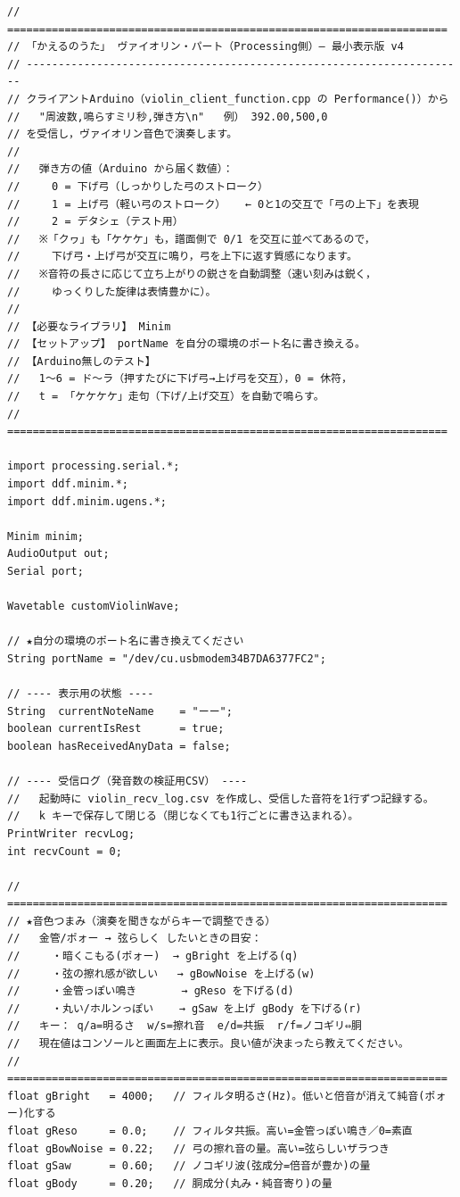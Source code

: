 \begin{lstlisting}
// =====================================================================
// 「かえるのうた」 ヴァイオリン・パート（Processing側）― 最小表示版 v4
// ---------------------------------------------------------------------
// クライアントArduino（violin_client_function.cpp の Performance()）から
//   "周波数,鳴らすミリ秒,弾き方\n"   例） 392.00,500,0
// を受信し，ヴァイオリン音色で演奏します。
//
//   弾き方の値（Arduino から届く数値）：
//     0 = 下げ弓（しっかりした弓のストローク）
//     1 = 上げ弓（軽い弓のストローク）   ← 0と1の交互で「弓の上下」を表現
//     2 = デタシェ（テスト用）
//   ※「クヮ」も「ケケケ」も，譜面側で 0/1 を交互に並べてあるので，
//     下げ弓・上げ弓が交互に鳴り，弓を上下に返す質感になります。
//   ※音符の長さに応じて立ち上がりの鋭さを自動調整（速い刻みは鋭く，
//     ゆっくりした旋律は表情豊かに）。
//
// 【必要なライブラリ】 Minim
// 【セットアップ】 portName を自分の環境のポート名に書き換える。
// 【Arduino無しのテスト】
//   1〜6 = ド〜ラ（押すたびに下げ弓→上げ弓を交互），0 = 休符，
//   t = 「ケケケケ」走句（下げ/上げ交互）を自動で鳴らす。
// =====================================================================

import processing.serial.*;
import ddf.minim.*;
import ddf.minim.ugens.*;

Minim minim;
AudioOutput out;
Serial port;

Wavetable customViolinWave;

// ★自分の環境のポート名に書き換えてください
String portName = "/dev/cu.usbmodem34B7DA6377FC2";

// ---- 表示用の状態 ----
String  currentNoteName    = "ーー";
boolean currentIsRest      = true;
boolean hasReceivedAnyData = false;

// ---- 受信ログ（発音数の検証用CSV） ----
//   起動時に violin_recv_log.csv を作成し、受信した音符を1行ずつ記録する。
//   k キーで保存して閉じる（閉じなくても1行ごとに書き込まれる）。
PrintWriter recvLog;
int recvCount = 0;

// =====================================================================
// ★音色つまみ（演奏を聞きながらキーで調整できる）
//   金管/ポォー → 弦らしく したいときの目安：
//     ・暗くこもる(ポォー)  → gBright を上げる(q)
//     ・弦の擦れ感が欲しい   → gBowNoise を上げる(w)
//     ・金管っぽい鳴き       → gReso を下げる(d)
//     ・丸い/ホルンっぽい    → gSaw を上げ gBody を下げる(r)
//   キー： q/a=明るさ  w/s=擦れ音  e/d=共振  r/f=ノコギリ⇔胴
//   現在値はコンソールと画面左上に表示。良い値が決まったら教えてください。
// =====================================================================
float gBright   = 4000;   // フィルタ明るさ(Hz)。低いと倍音が消えて純音(ポォー)化する
float gReso     = 0.0;    // フィルタ共振。高い=金管っぽい鳴き／0=素直
float gBowNoise = 0.22;   // 弓の擦れ音の量。高い=弦らしいザラつき
float gSaw      = 0.60;   // ノコギリ波(弦成分=倍音が豊か)の量
float gBody     = 0.20;   // 胴成分(丸み・純音寄り)の量


\end{lstlisting}
